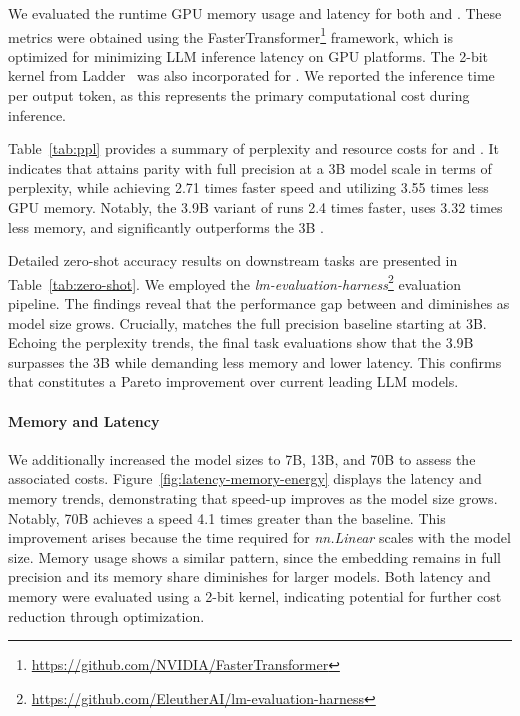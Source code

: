 We evaluated the runtime GPU memory usage and latency for both  and . These metrics were obtained using the FasterTransformer\footnote{\url{https://github.com/NVIDIA/FasterTransformer}} framework, which is optimized for minimizing LLM inference latency on GPU platforms. The 2-bit kernel from Ladder~\cite{ladder} was also incorporated for . We reported the inference time per output token, as this represents the primary computational cost during inference.

Table~\ref{tab:ppl} provides a summary of perplexity and resource costs for  and . It indicates that  attains parity with full precision  at a 3B model scale in terms of perplexity, while achieving 2.71 times faster speed and utilizing 3.55 times less GPU memory. Notably, the 3.9B variant of  runs 2.4 times faster, uses 3.32 times less memory, and significantly outperforms the 3B .

Detailed zero-shot accuracy results on downstream tasks are presented in Table~\ref{tab:zero-shot}. We employed the \emph{lm-evaluation-harness}\footnote{\url{https://github.com/EleutherAI/lm-evaluation-harness}} evaluation pipeline. The findings reveal that the performance gap between  and  diminishes as model size grows. Crucially,  matches the full precision baseline starting at 3B. Echoing the perplexity trends, the final task evaluations show that the 3.9B  surpasses the 3B  while demanding less memory and lower latency. This confirms that  constitutes a Pareto improvement over current leading LLM models.

\paragraph{Memory and Latency}

We additionally increased the model sizes to 7B, 13B, and 70B to assess the associated costs. Figure~\ref{fig:latency-memory-energy} displays the latency and memory trends, demonstrating that speed-up improves as the model size grows. Notably,  70B achieves a speed 4.1 times greater than the  baseline. This improvement arises because the time required for \emph{nn.Linear} scales with the model size. Memory usage shows a similar pattern, since the embedding remains in full precision and its memory share diminishes for larger models. Both latency and memory were evaluated using a 2-bit kernel, indicating potential for further cost reduction through optimization.

